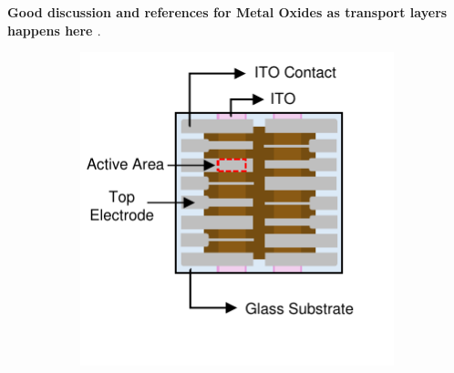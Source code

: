 \textbf{Good discussion and references for Metal Oxides as transport layers happens here \cite{Yang2023InvertedPassivation}}.






\begin{figure}[htbp]
    \centering
    \begin{subfigure}[t]{0.49\textwidth} %
        \centering
        \includegraphics[width=\textwidth]{chapters/material_properties/images/Glass_Substrate.pdf} %
        \caption{}
        \label{fig:ch2:glass_substrate}
    \end{subfigure}
    \hfill %
    \begin{subfigure}[t]{0.49\textwidth} %
        \centering

\end{subfigure}
\end{figure}
